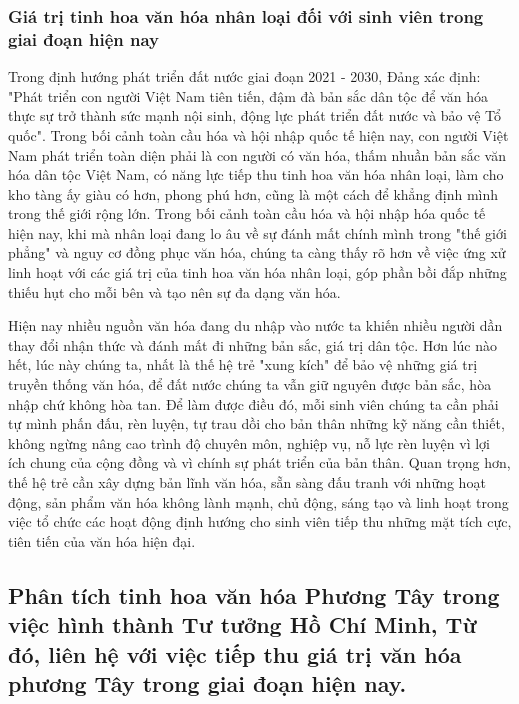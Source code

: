 \subsubsection{Giá trị tinh hoa văn hóa nhân loại đối với sinh viên trong giai đoạn hiện nay}

Trong định hướng phát triển đất nước giai đoạn 2021 - 2030, Đảng xác định: "Phát triển con người Việt Nam tiên tiến, đậm đà bản sắc dân tộc để văn hóa thực sự trở thành sức mạnh nội sinh, động lực phát triển đất nước và bảo vệ Tổ quốc". Trong bối cảnh toàn cầu hóa và hội nhập quốc tế hiện nay, con người Việt Nam phát triển toàn diện phải là con người có văn hóa, thấm nhuần bản sắc văn hóa dân tộc Việt Nam, có năng lực tiếp thu tinh hoa văn hóa nhân loại, làm cho kho tàng ấy giàu có hơn, phong phú hơn, cũng là một cách để khẳng định mình trong thế giới rộng lớn. Trong bối cảnh toàn cầu hóa và hội nhập hóa quốc tế hiện nay, khi mà nhân loại đang lo âu về sự đánh mất chính mình trong "thế giới phẳng" và nguy cơ đồng phục văn hóa, chúng ta càng thấy rõ hơn về việc ứng xử linh hoạt với các giá trị của tinh hoa văn hóa nhân loại, góp phần bồi đắp những thiếu hụt cho mỗi bên và tạo nên sự đa dạng văn hóa.

Hiện nay nhiều nguồn văn hóa đang du nhập vào nước ta khiến nhiều người dần thay đổi nhận thức và đánh mất đi những bản sắc, giá trị dân tộc. Hơn lúc nào hết, lúc này chúng ta, nhất là thế hệ trẻ "xung kích" để bảo vệ những giá trị truyền thống văn hóa, để đất nước chúng ta vẫn giữ nguyên được bản sắc, hòa nhập chứ không hòa tan. Để làm được điều đó, mỗi sinh viên chúng ta cần phải tự mình phấn đấu, rèn luyện, tự trau dồi cho bản thân những kỹ năng cần thiết, không ngừng nâng cao trình độ chuyên môn, nghiệp vụ, nỗ lực rèn luyện vì lợi ích chung của cộng đồng và vì chính sự phát triển của bản thân. Quan trọng hơn, thế hệ trẻ cần xây dựng bản lĩnh văn hóa, sẵn sàng đấu tranh với những hoạt động, sản phẩm văn hóa không lành mạnh, chủ động, sáng tạo và linh hoạt trong việc tổ chức các hoạt động định hướng cho sinh viên tiếp thu những mặt tích cực, tiên tiến của văn hóa hiện đại.

\cleardoublepage

\subsection{Phân tích tinh hoa văn hóa Phương Tây trong việc hình thành Tư tưởng Hồ Chí Minh, Từ đó, liên hệ với việc tiếp thu giá trị văn hóa phương Tây trong giai đoạn hiện nay.}

